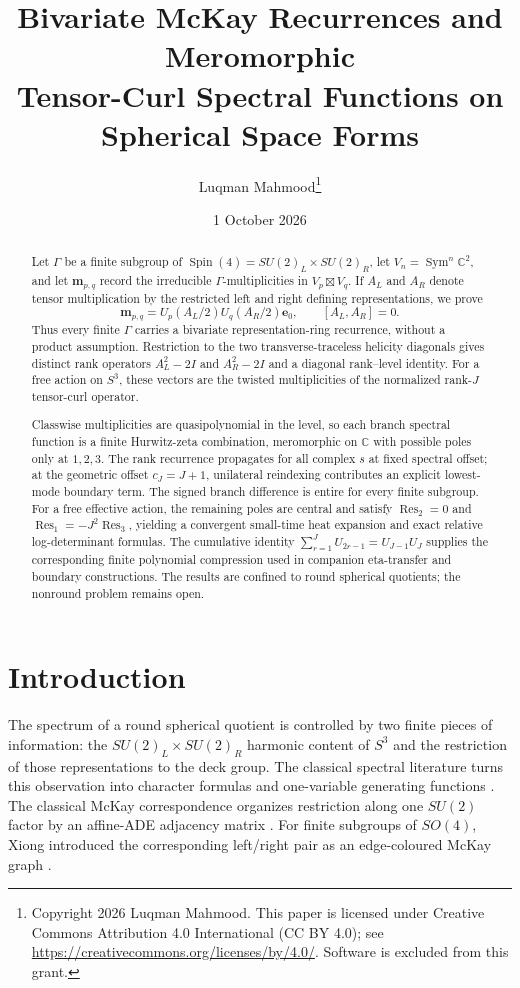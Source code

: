 \documentclass[11pt]{article}
\title{Bivariate McKay Recurrences and Meromorphic\\
Tensor-Curl Spectral Functions on Spherical Space Forms}
\author{Luqman Mahmood\thanks{Copyright 2026 Luqman Mahmood. This paper is licensed under Creative Commons Attribution 4.0 International (CC BY 4.0); see \url{https://creativecommons.org/licenses/by/4.0/}. Software is excluded from this grant.}}
\date{1 October 2026}
\theoremstyle{definition}
\DeclareMathOperator{\Sym}{Sym}
\DeclareMathOperator{\Res}{Res}
\newcommand{\C}{\mathbb C}
\begin{document}
\maketitle

\begin{abstract}
Let $\Gamma$ be a finite subgroup of
$\operatorname{Spin}(4)=SU(2)_L\times SU(2)_R$, let
$V_n=\Sym^n\C^2$, and let $\boldsymbol m_{p,q}$ record the irreducible
$\Gamma$-multiplicities in $V_p\boxtimes V_q$.  If $A_L$ and $A_R$
denote tensor multiplication by the restricted left and right defining
representations, we prove
\[
 \boldsymbol m_{p,q}
 =U_p(A_L/2)U_q(A_R/2)\boldsymbol e_0,
 \qquad [A_L,A_R]=0.
\]
Thus every finite $\Gamma$ carries a bivariate representation-ring
recurrence, without a product assumption.  Restriction to the two
transverse-traceless helicity diagonals gives distinct rank operators
$A_L^2-2I$ and $A_R^2-2I$ and a diagonal rank--level identity.  For a
free action on $S^3$, these vectors are the twisted multiplicities of the
normalized rank-$J$ tensor-curl operator.

Classwise multiplicities are quasipolynomial in the level, so each branch
spectral function is a finite Hurwitz-zeta combination, meromorphic on
$\C$ with possible poles only at $1,2,3$.  The rank recurrence propagates
for all complex $s$ at fixed spectral offset; at the geometric offset
$c_J=J+1$, unilateral reindexing contributes an explicit lowest-mode
boundary term.  The signed branch difference is entire for every finite
subgroup.  For a free effective action, the remaining poles are central
and satisfy $\Res_2=0$ and $\Res_1=-J^2\Res_3$, yielding a convergent
small-time heat expansion and exact relative log-determinant formulas.
The cumulative identity
$\sum_{r=1}^{J}U_{2r-1}=U_{J-1}U_J$ supplies the corresponding finite
polynomial compression used in companion eta-transfer and boundary
constructions.  The results are confined to round spherical quotients;
the nonround problem remains open.
\end{abstract}

\section{Introduction}

The spectrum of a round spherical quotient is controlled by two finite
pieces of information: the $SU(2)_L\times SU(2)_R$ harmonic content of
$S^3$ and the restriction of those representations to the deck group.
The classical spectral literature turns this observation into character
formulas and one-variable generating functions
\cite{Ikeda1980I,Ikeda1980II,Ikeda1980Lens,Bar1996,
LauretMiatelloRossetti2021}.  The classical McKay correspondence organizes
restriction along one $SU(2)$ factor by an affine-ADE adjacency matrix
\cite{McKay1980,Kostant1985,Rossmann2003,Suter2007,
Benkart2016,JingWangZhang2020,JingWangZhang2021}.
For finite subgroups of $SO(4)$, Xiong introduced the corresponding
left/right pair as an edge-coloured McKay graph \cite{Xiong2020}.
\end{document}
